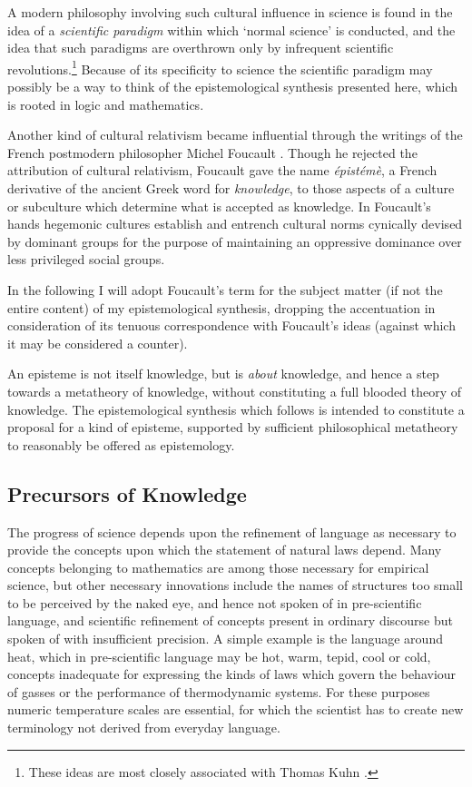 \documentclass[10pt,titlepage]{book}
\begin{document}
A modern philosophy involving such cultural influence in science is found in the idea of a \emph{scientific paradigm} within which `normal science' is conducted, and the idea that such paradigms are overthrown only by infrequent scientific revolutions.\footnote{These ideas are most closely associated with Thomas Kuhn \cite{kuhn2012structure,kuhn2000structure}.}
Because of its specificity to science the scientific paradigm may possibly be a way to think of the epistemological synthesis presented here, which is rooted in logic and mathematics.

Another kind of cultural relativism became influential through the writings of the French postmodern philosopher Michel Foucault \cite{foucault1966order}.
Though he rejected the attribution of cultural relativism, Foucault gave the name \emph{épistémè}, a French derivative of the ancient Greek word for \emph{knowledge}, to those aspects of a culture or subculture which determine what is accepted as knowledge.
In Foucault's hands hegemonic cultures establish and entrench cultural norms cynically devised by dominant groups for the purpose of maintaining an oppressive dominance over less privileged social groups.

In the following I will adopt Foucault's term for the subject matter (if not the entire content) of my epistemological synthesis, dropping the accentuation in consideration of its tenuous correspondence with Foucault's ideas (against which it may be considered a counter).

An episteme is not itself knowledge, but is \emph{about} knowledge, and hence a step towards a metatheory of knowledge, without constituting a full blooded theory of knowledge.
The epistemological synthesis which follows is intended to constitute a proposal for a kind of episteme, supported by sufficient philosophical metatheory to reasonably be offered as epistemology.

\subsection{Precursors of Knowledge}

The progress of science depends upon the refinement of language as necessary to provide the concepts upon which the statement of natural laws depend.
Many concepts belonging to  mathematics are among those necessary for empirical science, but other necessary innovations include the names of structures too small to be perceived by the naked eye, and hence not spoken of in pre-scientific language, and scientific refinement of concepts present in ordinary discourse but spoken of with insufficient precision.
A simple example is the language around heat, which in pre-scientific language may be hot, warm, tepid, cool or cold, concepts inadequate for expressing the kinds of laws which govern the behaviour of gasses or the performance of thermodynamic systems.
For these purposes numeric temperature scales are essential, for which the scientist has to create new terminology not derived from everyday language.
\end{document}
